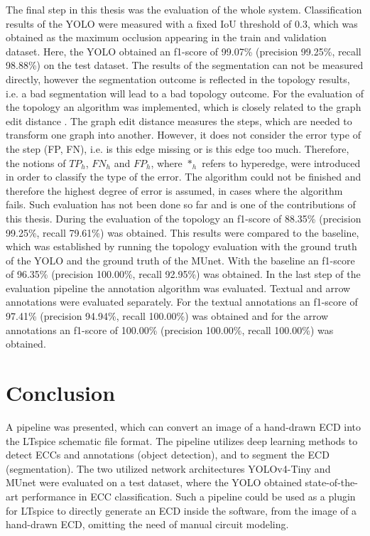 The final step in this thesis was the evaluation of the whole system.
Classification results of the \ac{YOLO} were measured with a fixed \ac{IoU} threshold  of 0.3, which was obtained as the maximum occlusion appearing in the train and validation dataset.
Here, the \ac{YOLO} obtained an f1-score of 99.07\% (precision 99.25\%, recall 98.88\%) on the test dataset.
The results of the segmentation can not be measured directly, however the segmentation outcome is reflected in the topology results, i.e. a bad segmentation will lead to a bad topology outcome.
For the evaluation of the topology an algorithm was implemented, which is closely related to the graph edit distance \cite{graph_edit_distance}.
The graph edit distance measures the steps, which are needed to transform one graph into another.
However, it does not consider the error type of the step (\ac{FP}, \ac{FN}), i.e. is this edge missing or is this edge too much.
Therefore, the notions of $TP_h$, $FN_h$ and $FP_h$, where $*_h$ refers to hyperedge, were introduced in order to classify the type of the error.
The algorithm could not be finished and therefore the highest degree of error is assumed, in cases where the algorithm fails.
Such evaluation has not been done so far and is one of the contributions of this thesis.
During the evaluation of the topology an f1-score of 88.35\% (precision 99.25\%, recall 79.61\%) was obtained.
This results were compared to the baseline, which was established by running the topology evaluation with the ground truth of the \ac{YOLO} and the ground truth of the \ac{MUnet}.
With the baseline an f1-score of 96.35\% (precision 100.00\%, recall 92.95\%) was obtained.
In the last step of the evaluation pipeline the annotation algorithm was evaluated.
Textual and arrow annotations were evaluated separately.
For the textual annotations an f1-score of 97.41\% (precision 94.94\%, recall 100.00\%) was obtained and for the arrow annotations an f1-score of 100.00\% (precision 100.00\%, recall 100.00\%) was obtained.

\section{Conclusion}

A pipeline was presented, which can convert an image of a hand-drawn \ac{ECD} into the LTspice schematic file format.
The pipeline utilizes deep learning methods to detect \acp{ECC} and annotations (object detection), and to segment the \ac{ECD} (segmentation).
The two utilized network architectures \ac{YOLOv4}-Tiny and \ac{MUnet} were evaluated on a test dataset, where the \ac{YOLO} obtained state-of-the-art performance in \ac{ECC} classification.
Such a pipeline could be used as a plugin for LTspice to directly generate an \ac{ECD} inside the software, from the image of a hand-drawn \ac{ECD}, omitting the need of manual circuit modeling.

